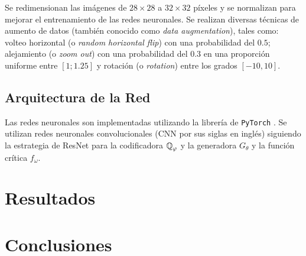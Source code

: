 Se redimensionan las imágenes de $28\times28$ a $32\times32$ píxeles y se normalizan para mejorar el entrenamiento de las redes neuronales. Se realizan diversas técnicas de aumento de datos (también conocido como \textit{data augmentation}), tales como: volteo horizontal (o \textit{random horizontal flip}) con una probabilidad del $0.5$; alejamiento (o \textit{zoom out}) con una probabilidad del $0.3$ en una proporción uniforme entre $[1; 1.25]$ y rotación (o \textit{rotation}) entre los grados $[-10, 10]$.


\subsection{Arquitectura de la Red}\label{ssec:arquitectura-red}  %

Las redes neuronales son implementadas utilizando la librería de \texttt{PyTorch} \cite{paszke2019pytorch}. Se utilizan redes neuronales convolucionales (CNN por sus siglas en inglés) siguiendo la estrategia de ResNet \cite{he2016deep} para la codificadora $\ProbQ_\varphi$ y la generadora $G_\theta$ y la función crítica $f_\omega$.


\section{Resultados}\label{sec:resultados-wae-wgan}  %


\section{Conclusiones}\label{sec:conclusiones-wae-wgan}  %



